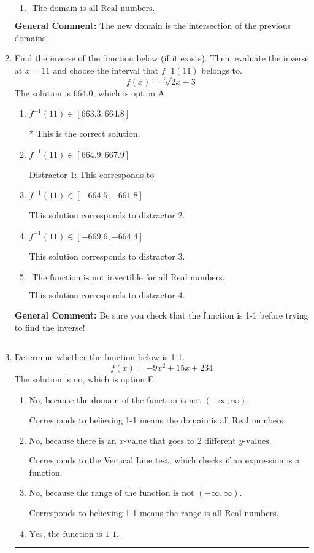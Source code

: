 \documentclass{extbook}[14pt]
\newcommand{\litem}[1]{\item #1

\rule{\textwidth}{0.4pt}}
\begin{document}
\begin{enumerate}
{\begin{enumerate}[label=\Alph*.]
\item \( \text{ The domain is all Real numbers. } \)


\end{enumerate}

\textbf{General Comment:} The new domain is the intersection of the previous domains.
}
\litem{
Find the inverse of the function below (if it exists). Then, evaluate the inverse at $x = 11$ and choose the interval that $f^-1(11)$ belongs to.
\[ f(x) = \sqrt[3]{2 x + 3} \]The solution is \( 664.0 \), which is option A.\begin{enumerate}[label=\Alph*.]
\item \( f^{-1}(11) \in [663.3, 664.8] \)

* This is the correct solution.
\item \( f^{-1}(11) \in [664.9, 667.9] \)

 Distractor 1: This corresponds to 
\item \( f^{-1}(11) \in [-664.5, -661.8] \)

 This solution corresponds to distractor 2.
\item \( f^{-1}(11) \in [-669.6, -664.4] \)

 This solution corresponds to distractor 3.
\item \( \text{ The function is not invertible for all Real numbers. } \)

 This solution corresponds to distractor 4.
\end{enumerate}

\textbf{General Comment:} Be sure you check that the function is 1-1 before trying to find the inverse!
}
\litem{
Determine whether the function below is 1-1.
\[ f(x) = -9 x^2 + 15 x + 234 \]The solution is \( \text{no} \), which is option E.\begin{enumerate}[label=\Alph*.]
\item \( \text{No, because the domain of the function is not $(-\infty, \infty)$.} \)

Corresponds to believing 1-1 means the domain is all Real numbers.
\item \( \text{No, because there is an $x$-value that goes to 2 different $y$-values.} \)

Corresponds to the Vertical Line test, which checks if an expression is a function.
\item \( \text{No, because the range of the function is not $(-\infty, \infty)$.} \)

Corresponds to believing 1-1 means the range is all Real numbers.
\item \( \text{Yes, the function is 1-1.} \)


\end{enumerate}}
\end{enumerate}
\end{document}
